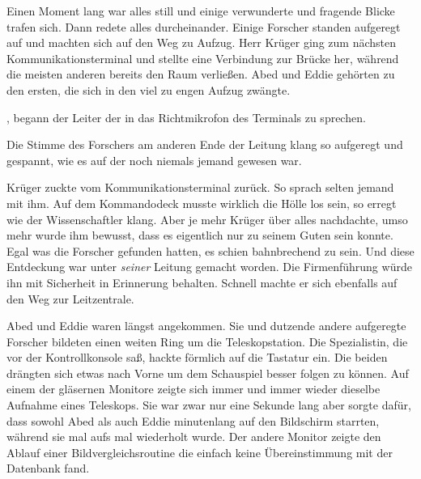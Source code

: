\par

Einen Moment lang war alles still und einige verwunderte und fragende Blicke trafen sich. Dann redete alles durcheinander. Einige Forscher standen aufgeregt auf und machten sich auf den Weg zu Aufzug. Herr Krüger ging zum nächsten Kommunikationsterminal und stellte eine Verbindung zur Brücke her, während die meisten anderen bereits den Raum verließen. Abed und Eddie gehörten zu den ersten, die sich in den viel zu engen Aufzug zwängte.

\par

, begann der Leiter der  in das Richtmikrofon des Terminals zu sprechen. 

\par

Die Stimme des Forschers am anderen Ende der Leitung klang so aufgeregt und gespannt, wie es auf der  noch niemals jemand gewesen war. 

\par

Krüger zuckte vom Kommunikationsterminal zurück. So sprach selten jemand mit ihm. Auf dem Kommandodeck musste wirklich die Hölle los sein, so erregt wie der Wissenschaftler klang. Aber je mehr Krüger über alles nachdachte, umso mehr wurde ihm bewusst, dass es eigentlich nur zu seinem Guten sein konnte. Egal was die Forscher gefunden hatten, es schien bahnbrechend zu sein. Und diese Entdeckung war unter \textit{seiner} Leitung gemacht worden. Die Firmenführung würde ihn mit Sicherheit in Erinnerung behalten. Schnell machte er sich ebenfalls auf den Weg zur Leitzentrale.

\par

Abed und Eddie waren längst angekommen. Sie und dutzende andere aufgeregte Forscher bildeten einen weiten Ring um die Teleskopstation. Die Spezialistin, die vor der Kontrollkonsole saß, hackte förmlich auf die Tastatur ein. Die beiden drängten sich etwas nach Vorne um dem Schauspiel besser folgen zu können. Auf einem der gläsernen Monitore zeigte sich immer und immer wieder dieselbe Aufnahme eines Teleskops. Sie war zwar nur eine Sekunde lang aber sorgte dafür, dass sowohl Abed als auch Eddie minutenlang auf den Bildschirm starrten, während sie mal aufs mal wiederholt wurde. Der andere Monitor zeigte den Ablauf einer Bildvergleichsroutine die einfach keine Übereinstimmung mit der Datenbank fand.

